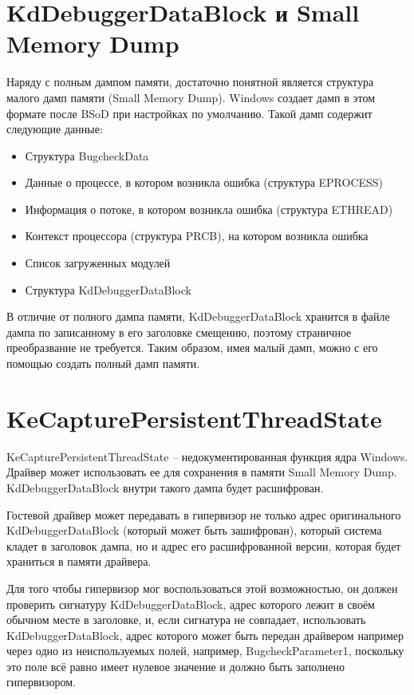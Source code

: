 \documentclass{mipt-thesis-bs}
\begin{document}
\section*{KdDebuggerDataBlock и Small Memory Dump}

Наряду с полным дампом памяти, достаточно понятной является структура малого дамп памяти (Small Memory Dump). Windows создает дамп в этом формате после BSoD при настройках по умолчанию. Такой дамп содержит следующие данные:

\begin{itemize}
    \item Структура BugcheckData
    \item Данные о процессе, в котором возникла ошибка (структура EPROCESS)
    \item Информация о потоке, в котором возникла ошибка (структура ETHREAD)
    \item Контекст процессора (структура PRCB), на котором возникла ошибка
    \item Список загруженных модулей
    \item Структура KdDebuggerDataBlock
\end{itemize}

В отличие от полного дампа памяти, KdDebuggerDataBlock хранится в файле дампа по записанному в его заголовке смещению, поэтому страничное преобразвание не требуется. Таким образом, имея малый дамп, можно с его помощью создать полный дамп памяти.

\section*{KeCapturePersistentThreadState}

KeCapturePersistentThreadState -- недокументированная функция ядра Windows. Драйвер может использовать ее для сохранения в памяти Small Memory Dump. KdDebuggerDataBlock внутри такого дампа будет расшифрован.

Гостевой драйвер может передавать в гипервизор не только адрес оригинального KdDebuggerDataBlock (который может быть зашифрован), который система кладет в заголовок дампа, но и адрес его расшифрованной версии, которая будет храниться в памяти драйвера.

Для того чтобы гипервизор мог воспользоваться этой возможностью, он должен проверить сигнатуру KdDebuggerDataBlock, адрес которого лежит в своём обычном месте в заголовке, и, если сигнатура не совпадает, использовать KdDebuggerDataBlock, адрес которого может быть передан драйвером например через одно из неиспользуемых полей, например, BugcheckParameter1, поскольку это поле всё равно имеет нулевое значение и должно быть заполнено гипервизором.
\end{document}
